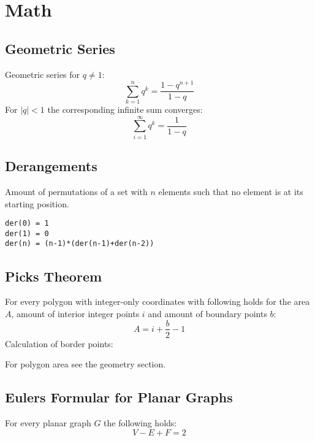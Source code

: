 \section{Math}

\subsection{Geometric Series}
Geometric series for $q \neq 1$:
\[
\sum\limits_{k=1}^n q^k = \frac{1-q^{n+1}}{1-q}
\]
For $\lvert q \rvert < 1$ the corresponding infinite sum converges:
\[
\sum_{i = 1}^{\infty} q^k = \frac{1}{1 - q}
\]

\subsection{Derangements}
Amount of permutations of a set with $n$ elements such that no element is at its starting position.
\begin{lstlisting} 
der(0) = 1
der(1) = 0
der(n) = (n-1)*(der(n-1)+der(n-2))
\end{lstlisting}

\subsection{Picks Theorem}
For every polygon with integer-only coordinates with following holds for the area $A$, amount of interior integer points $i$ and amount of boundary points $b$:
\[
A = i + \frac{b}{2} - 1
\]
Calculation of border points:

For polygon area see the geometry section.

\subsection{Eulers Formular for Planar Graphs}
For every planar graph $G$ the following holds:
\[
V - E + F = 2
\]
